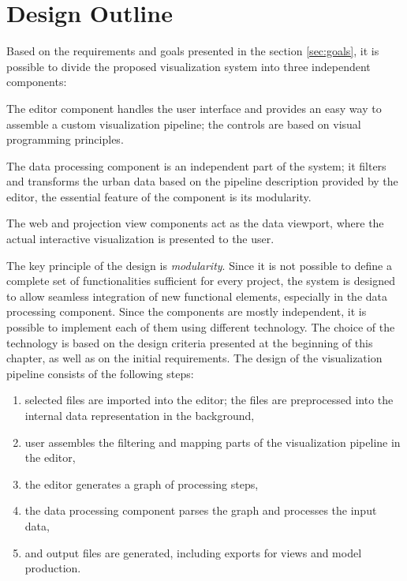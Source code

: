 \section{Design Outline}
Based on the requirements and goals presented in the section \ref{sec:goals}, it is possible to divide the proposed  visualization system into three independent components:
\begin{description}[noitemsep]
    \item[Editor] The editor component handles the user interface and provides an easy way to assemble a custom visualization pipeline; the controls are based on visual programming principles.
    \item[Data Processing] The data processing component is an independent part of the system; it filters and transforms the urban data based on the pipeline description provided by the editor, the essential feature of the component is its modularity.
    \item[Web and Projection Views] The web and projection view components act as the data viewport, where the actual interactive visualization is presented to the user.  
\end{description}

The key principle of the design is \textit{modularity}. Since it is not possible to define a complete set of functionalities sufficient for every project, the system is designed to allow seamless integration of new functional elements, especially in the data processing component. Since the components are mostly independent, it is possible to implement each of them using different technology. The choice of the technology is based on the design criteria presented at the beginning of this chapter, as well as on the initial requirements. The design of the visualization pipeline consists of the following steps:
\begin{enumerate}
    \item selected files are imported into the editor; the files are preprocessed into the internal data representation in the background,
    \item user assembles the filtering and mapping parts of the visualization pipeline in the editor,
    \item the editor generates a graph of processing steps,
    \item the data processing component parses the graph and processes the input data,
    \item and output files are generated, including exports for views and model production.  
\end{enumerate}

